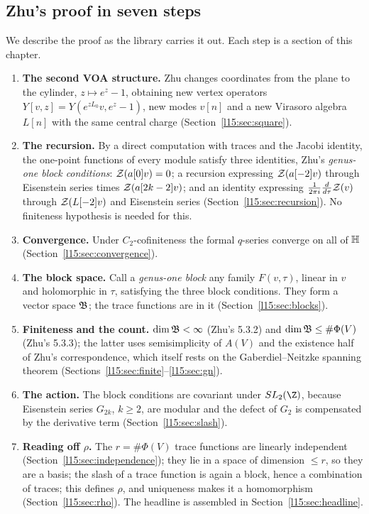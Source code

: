 \subsection{Zhu's proof in seven steps}\label{l15:sec:steps}

We describe the proof as the library carries it out. Each step is a section of this chapter.
\begin{enumerate}
\item \textbf{The second VOA structure.} Zhu changes coordinates from the plane to the cylinder, $z\mapsto e^{z}-1$,
  obtaining new vertex operators $Y[v,z]=Y(e^{zL_0}v,e^z-1)$, new modes $v[n]$ and a new Virasoro algebra $L[n]$ with the
  same central charge (Section~\ref{l15:sec:square}).
\item \textbf{The recursion.} By a direct computation with traces and the Jacobi identity, the one-point functions of
  every module satisfy three identities, Zhu's \emph{genus-one block conditions}: $\mathcal{Z}(a[0]v)=0$; a recursion
  expressing $\mathcal{Z}(a[-2]v)$ through Eisenstein series times $\mathcal{Z}(a[2k-2]v)$; and an identity expressing
  $\frac{1}{2\pi i}\frac{d}{d\tau}\mathcal{Z}(v)$ through $\mathcal{Z}(L[-2]v)$ and Eisenstein series
  (Section~\ref{l15:sec:recursion}). No finiteness hypothesis is needed for this.
\item \textbf{Convergence.} Under $C_2$-cofiniteness the formal $q$-series converge on all of $\mathbb{H}$
  (Section~\ref{l15:sec:convergence}).
\item \textbf{The block space.} Call a \emph{genus-one block} any family $F(v,\tau)$, linear in $v$ and holomorphic in
  $\tau$, satisfying the three block conditions. They form a vector space $\mathfrak{B}$; the trace functions are in it
  (Section~\ref{l15:sec:blocks}).
\item \textbf{Finiteness and the count.} $\dim\mathfrak{B}<\infty$ (Zhu's 5.3.2) and $\dim\mathfrak{B}\le\#\Phi(V)$ (Zhu's
  5.3.3); the latter uses semisimplicity of $A(V)$ and the existence half of Zhu's correspondence, which itself rests on
  the Gaberdiel--Neitzke spanning theorem (Sections~\ref{l15:sec:finite}--\ref{l15:sec:gn}).
\item \textbf{The action.} The block conditions are covariant under $\lfifteenSL$, because Eisenstein series $G_{2k}$,
  $k\ge2$, are modular and the defect of $G_2$ is compensated by the derivative term (Section~\ref{l15:sec:slash}).
\item \textbf{Reading off $\rho$.} The $r=\#\Phi(V)$ trace functions are linearly independent
  (Section~\ref{l15:sec:independence}); they lie in a space of dimension $\le r$, so they are a basis; the slash of a
  trace function is again a block, hence a combination of traces; this defines $\rho$, and uniqueness makes it a
  homomorphism (Section~\ref{l15:sec:rho}). The headline is assembled in Section~\ref{l15:sec:headline}.
\end{enumerate}

